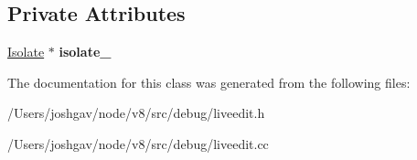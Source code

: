 \subsection*{Private Attributes}
\begin{DoxyCompactItemize}
\item 
\hyperlink{classv8_1_1internal_1_1_isolate}{Isolate} $\ast$ {\bfseries isolate\+\_\+}\hypertarget{classv8_1_1internal_1_1_live_edit_function_tracker_a30b19b1d64513b3dcfa113b62e1939ca}{}\label{classv8_1_1internal_1_1_live_edit_function_tracker_a30b19b1d64513b3dcfa113b62e1939ca}

\end{DoxyCompactItemize}


The documentation for this class was generated from the following files\+:\begin{DoxyCompactItemize}
\item 
/\+Users/joshgav/node/v8/src/debug/liveedit.\+h\item 
/\+Users/joshgav/node/v8/src/debug/liveedit.\+cc\end{DoxyCompactItemize}
